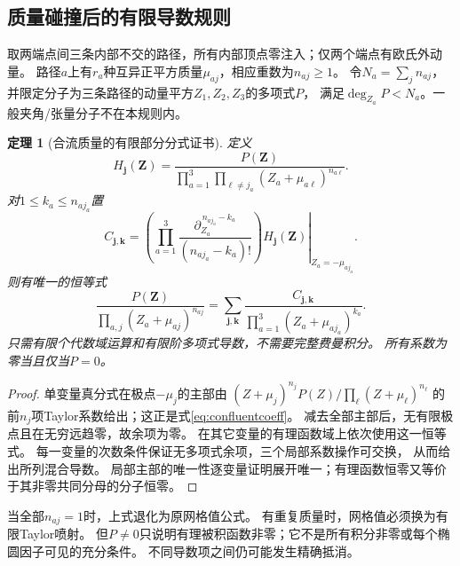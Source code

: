 \documentclass[11pt,a4paper]{ctexart}
\theoremstyle{cnplain}\newtheorem{theorem}{定理}[section]
\theoremstyle{definition}\newtheorem{definition}[theorem]{定义}
\theoremstyle{remark}\newtheorem{remark}[theorem]{注}
\begin{document}
\subsection{质量碰撞后的有限导数规则}
\label{subsec:confluenttheta}
取两端点间三条内部不交的路径，所有内部顶点零注入；仅两个端点有欧氏外动量。
路径$a$上有$r_a$种互异正平方质量$\mu_{aj}$，相应重数为$n_{aj}\ge1$。
令$N_a=\sum_j n_{aj}$，并限定分子为三条路径的动量平方$Z_1,Z_2,Z_3$的多项式$P$，
满足$\deg_{Z_a}P<N_a$。一般夹角/张量分子不在本规则内。
\begin{theorem}[合流质量的有限部分分式证书]\label{thm:confluentcertificate}
定义
\[
 H_{\boldsymbol j}(\boldsymbol Z)=
 \frac{P(\boldsymbol Z)}{
  \prod_{a=1}^3\prod_{\ell\ne j_a}(Z_a+\mu_{a\ell})^{n_{a\ell}}}.
\]
对$1\le k_a\le n_{aj_a}$置
\begin{equation}\label{eq:confluentcoeff}
 C_{\boldsymbol j,\boldsymbol k}=
 \left.
 \left(\prod_{a=1}^3
 \frac{\partial_{Z_a}^{\,n_{aj_a}-k_a}}{(n_{aj_a}-k_a)!}\right)
 H_{\boldsymbol j}(\boldsymbol Z)
 \right|_{Z_a=-\mu_{aj_a}}.
\end{equation}
则有唯一的恒等式
\begin{equation}\label{eq:confluentpartial}
 \frac{P(\boldsymbol Z)}{
       \prod_{a,j}(Z_a+\mu_{aj})^{n_{aj}}}
 =\sum_{\boldsymbol j,\boldsymbol k}
      \frac{C_{\boldsymbol j,\boldsymbol k}}
           {\prod_{a=1}^3(Z_a+\mu_{aj_a})^{k_a}}.
\end{equation}
只需有限个代数域运算和有限阶多项式导数，不需要完整费曼积分。
所有系数为零当且仅当$P=0$。
\end{theorem}
\begin{proof}
单变量真分式在极点$-\mu_j$的主部由
$(Z+\mu_j)^{n_j}P(Z)/\prod_\ell(Z+\mu_\ell)^{n_\ell}$
的前$n_j$项Taylor系数给出；这正是式\eqref{eq:confluentcoeff}。
减去全部主部后，无有限极点且在无穷远趋零，故余项为零。
在其它变量的有理函数域上依次使用这一恒等式。
每一变量的次数条件保证无多项式余项，三个局部系数操作可交换，
从而给出所列混合导数。
局部主部的唯一性逐变量证明展开唯一；有理函数恒零又等价于其非零共同分母的分子恒零。
\end{proof}

当全部$n_{aj}=1$时，上式退化为原网格值公式。
有重复质量时，网格值必须换为有限Taylor喷射。
但$P\ne0$只说明有理被积函数非零；它不是所有积分非零或每个椭圆因子可见的充分条件。
不同导数项之间仍可能发生精确抵消。
\end{document}

